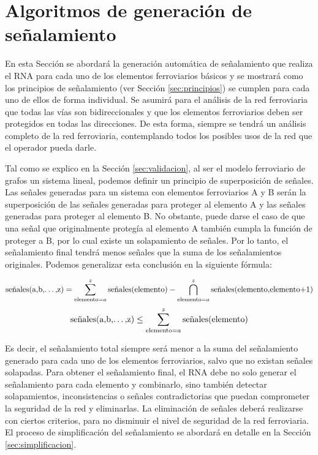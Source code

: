 \section{Algoritmos de generación de señalamiento}
    \label{sec:generacion}
    
    En esta Sección se abordará la generación automática de señalamiento que realiza el RNA para cada uno de los elementos ferroviarios básicos y se mostrará como los principios de señalamiento (ver Sección \ref{sec:principios}) se cumplen para cada uno de ellos de forma individual. Se asumirá para el análisis de la red ferroviaria que todas las vías son bidireccionales y que los elementos ferroviarios deben ser protegidos en todas las direcciones. De esta forma, siempre se tendrá un análisis completo de la red ferroviaria, contemplando todos los posibles usos de la red que el operador pueda darle.
    
    Tal como se explico en la Sección \ref{sec:validacion}, al ser el modelo ferroviario de grafos un sistema lineal, podemos definir un principio de superposición de señales. Las señales generadas para un sistema con elementos ferroviarios A y B serán la superposición de las señales generadas para proteger al elemento A y las señales generadas para proteger al elemento B. No obstante, puede darse el caso de que una señal que originalmente protegía al elemento A también cumpla la función de proteger a B, por lo cual existe un solapamiento de señales. Por lo tanto, el señalamiento final tendrá menos señales que la suma de los señalamientos originales. Podemos generalizar esta conclusión en la siguiente fórmula:

    \[ \text{señales(a,b,\dots,z)} = \sum_{\text{elemento}=a}^{z} \text{señales(elemento)} - \displaystyle\bigcap_{\text{elemento}=a}^{z} \text{señales(elemento,elemento+1)} \]
    \[ \text{señales(a,b,\dots,z)} \leq \sum_{\text{elemento}=a}^{z} \text{señales(elemento)} \]

    Es decir, el señalamiento total siempre será menor a la suma del señalamiento generado para cada uno de los elementos ferroviarios, salvo que no existan señales solapadas. Para obtener el señalamiento final, el RNA debe no solo generar el señalamiento para cada elemento y combinarlo, sino también detectar solapamientos, inconsistencias o señales contradictorias que puedan comprometer la seguridad de la red y eliminarlas. La eliminación de señales deberá realizarse con ciertos criterios, para no disminuir el nivel de seguridad de la red ferroviaria. El proceso de simplificación del señalamiento se abordará en detalle en la Sección \ref{sec:simplificacion}.

    
    
    
    
    